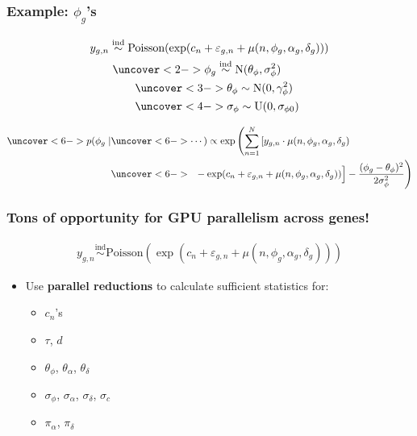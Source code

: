 \documentclass[handout]{beamer}
\providecommand{\e}{\varepsilon}
\numberwithin{equation}{section}
\begin{document}
\begin{frame}
\frametitle{Example: $\phi_g$'s} \small
\begin{align*}
&y_{g,n} \stackrel{\text{ind}}{\sim} \text{Poisson}( \exp(c_n + \e_{g, n} + \mu(n, \phi_g, \alpha_g, \delta_g))) \\
& \qquad \uncover<2->{\phi_g \stackrel{\text{ind}}{\sim} \text{N}( \theta_\phi, \sigma_\phi^2)} \\
& \qquad \qquad \uncover<3->{\theta_\phi \stackrel{\text{}}{\sim} \text{N}( 0, \gamma_{\phi }^2)} \\
& \qquad \qquad \uncover<4->{\sigma_\phi \stackrel{\text{}}{\sim} \text{U}( 0, \sigma_{\phi 0})} \\
\end{align*}

\begin{itemize}
\end{itemize}

\begin{align*}
\uncover<6->{p(\phi_g \mid} & \uncover<6->{ \cdots) \propto \exp \left (\sum_{n = 1}^N \left [y_{g, n} \cdot \mu(n, \phi_g, \alpha_g, \delta_g) \right . \right .}  \\
&\uncover<6->{\left . \left . \frac{}{}- \exp (c_n + \e_{g, n} + \mu(n, \phi_g, \alpha_g, \delta_g)) \right ] - \frac{(\phi_g - \theta_\phi)^2}{2 \sigma_\phi^2} \right )}
\end{align*}
\end{frame}


\begin{frame}
\frametitle{Tons of opportunity for GPU parallelism across genes!}
\begin{align*}
y_{g,n} \stackrel{\text{ind}}{\sim} \text{Poisson}( \exp(c_n + \e_{g, n} + \mu(n, \phi_g, \alpha_g, \delta_g)))
\end{align*}

\begin{itemize}
\pause \item Use {\color{blue} \bf parallel reductions} to calculate sufficient statistics for:
\begin{itemize}
\pause \item $c_n$'s
\pause \item $\tau$, $d$
\pause \item $\theta_\phi$, $\theta_\alpha$, $\theta_\delta$
\pause \item $\sigma_\phi$, $\sigma_\alpha$, $\sigma_\delta$,  $\sigma_c$ 
\pause \item $\pi_\alpha$, $\pi_\delta$
\end{itemize}
\end{itemize}
\end{frame}
\end{document}
